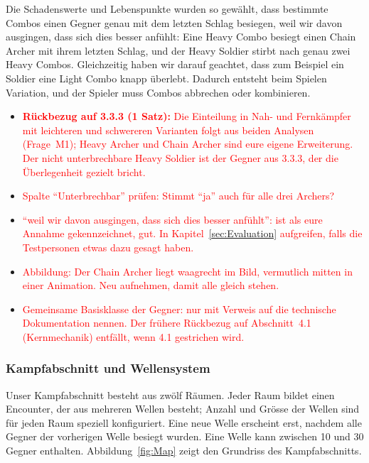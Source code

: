 \documentclass[../Main.tex]{subfiles}
\begin{document}
Die Schadenswerte und Lebenspunkte wurden so gewählt, dass bestimmte Combos einen Gegner genau mit dem letzten Schlag besiegen, weil wir davon ausgingen, dass sich dies besser anfühlt: Eine Heavy Combo besiegt einen Chain Archer mit ihrem letzten Schlag, und der Heavy Soldier stirbt nach genau zwei Heavy Combos. Gleichzeitig haben wir darauf geachtet, dass zum Beispiel ein Soldier eine Light Combo knapp überlebt. Dadurch entsteht beim Spielen Variation, und der Spieler muss Combos abbrechen oder kombinieren.

\begin{itemize}[leftmargin=1.5cm]
    \item \textcolor{red}{\textbf{Rückbezug auf 3.3.3 (1 Satz):} Die Einteilung in Nah- und Fernkämpfer mit leichteren und schwereren Varianten folgt aus beiden Analysen (Frage~M1); Heavy Archer und Chain Archer sind eure eigene Erweiterung. Der nicht unterbrechbare Heavy Soldier ist der Gegner aus 3.3.3, der die Überlegenheit gezielt bricht.}
    \item \textcolor{red}{Spalte \enquote{Unterbrechbar} prüfen: Stimmt \enquote{ja} auch für alle drei Archers?}
    \item \textcolor{red}{\enquote{weil wir davon ausgingen, dass sich dies besser anfühlt}: ist als eure Annahme gekennzeichnet, gut. In Kapitel~\ref{sec:Evaluation} aufgreifen, falls die Testpersonen etwas dazu gesagt haben.}
    \item \textcolor{red}{Abbildung: Der Chain Archer liegt waagrecht im Bild, vermutlich mitten in einer Animation. Neu aufnehmen, damit alle gleich stehen.}
    \item \textcolor{red}{Gemeinsame Basisklasse der Gegner: nur mit Verweis auf die technische Dokumentation nennen. Der frühere Rückbezug auf Abschnitt~4.1 (Kernmechanik) entfällt, wenn 4.1 gestrichen wird.}
\end{itemize}

\subsubsection{Kampfabschnitt und Wellensystem} \label{sec:Kampfabschnitt}

Unser Kampfabschnitt besteht aus zwölf Räumen. Jeder Raum bildet einen Encounter, der aus mehreren Wellen besteht; Anzahl und Grösse der Wellen sind für jeden Raum speziell konfiguriert. Eine neue Welle erscheint erst, nachdem alle Gegner der vorherigen Welle besiegt wurden. Eine Welle kann zwischen 10 und 30 Gegner enthalten. Abbildung~\ref{fig:Map} zeigt den Grundriss des Kampfabschnitts.
\end{document}
